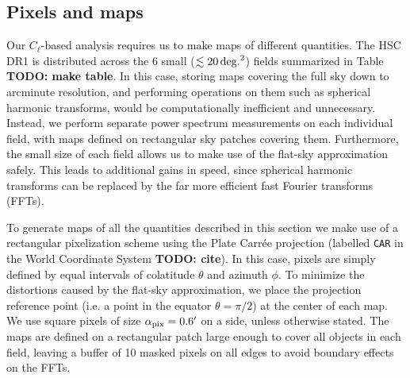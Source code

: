 \documentclass[a4paper,11pt]{article}
\newcommand{\todo}[1]{{\bf TODO: #1}}
\begin{document}
  \subsection{Pixels and maps}\label{ssec:methods.pix}
    Our $C_\ell$-based analysis requires us to make maps of different quantities. The HSC DR1 is distributed across the 6 small ($\lesssim20\,{\rm deg.}^2$) fields summarized in Table \todo{make table}. In this case, storing maps covering the full sky down to arcminute resolution, and performing operations on them such as spherical harmonic transforms, would be computationally inefficient and unnecessary. Instead, we perform separate power spectrum measurements on each individual field, with maps defined on rectangular sky patches covering them. Furthermore, the small size of each field allows us to make use of the flat-sky approximation safely. This leads to additional gains in speed, since spherical harmonic transforms can be replaced by the far more efficient fast Fourier transforms (FFTs).
    
    To generate maps of all the quantities described in this section we make use of a rectangular pixelization scheme using the Plate Carr\'ee projection (labelled {\tt CAR} in the World Coordinate System \todo{cite}). In this case, pixels are simply defined by equal intervals of colatitude $\theta$ and azimuth $\phi$. To minimize the distortions caused by the flat-sky approximation, we place the projection reference point (i.e. a point in the equator $\theta=\pi/2$) at the center of each map. We use square pixels of size $\alpha_{\rm pix}=0.6'$ on a side, unless otherwise stated. The maps are defined on a rectangular patch large enough to cover all objects in each field, leaving a buffer of 10 masked pixels on all edges to avoid boundary effects on the FFTs.
  
\end{document}
